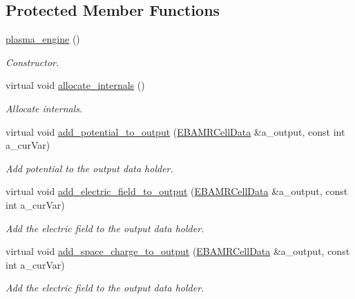 \subsection*{Protected Member Functions}
\begin{DoxyCompactItemize}
\item 
\hyperlink{classplasma__engine_a5de6e7c844a468810a056b2b923bb625}{plasma\+\_\+engine} ()
\begin{DoxyCompactList}\small\item\em Constructor. \end{DoxyCompactList}\item 
virtual void \hyperlink{classplasma__engine_a186feb938f8d800da45243488b01c8f8}{allocate\+\_\+internals} ()
\begin{DoxyCompactList}\small\item\em Allocate internals. \end{DoxyCompactList}\item 
virtual void \hyperlink{classplasma__engine_a586535d16064e18ed326bb8ff496c17c}{add\+\_\+potential\+\_\+to\+\_\+output} (\hyperlink{type__definitions_8H_a7e610f301989e5e07781c5e338bdb7c3}{E\+B\+A\+M\+R\+Cell\+Data} \&a\+\_\+output, const int a\+\_\+cur\+Var)
\begin{DoxyCompactList}\small\item\em Add potential to the output data holder. \end{DoxyCompactList}\item 
virtual void \hyperlink{classplasma__engine_a182c57c276c74bfd984c07c182b2d1f9}{add\+\_\+electric\+\_\+field\+\_\+to\+\_\+output} (\hyperlink{type__definitions_8H_a7e610f301989e5e07781c5e338bdb7c3}{E\+B\+A\+M\+R\+Cell\+Data} \&a\+\_\+output, const int a\+\_\+cur\+Var)
\begin{DoxyCompactList}\small\item\em Add the electric field to the output data holder. \end{DoxyCompactList}\item 
virtual void \hyperlink{classplasma__engine_a8f380f62b13bf66208bf581e79bc6103}{add\+\_\+space\+\_\+charge\+\_\+to\+\_\+output} (\hyperlink{type__definitions_8H_a7e610f301989e5e07781c5e338bdb7c3}{E\+B\+A\+M\+R\+Cell\+Data} \&a\+\_\+output, const int a\+\_\+cur\+Var)
\begin{DoxyCompactList}\small\item\em Add the electric field to the output data holder. \end{DoxyCompactList}\item 

\end{DoxyCompactItemize}
